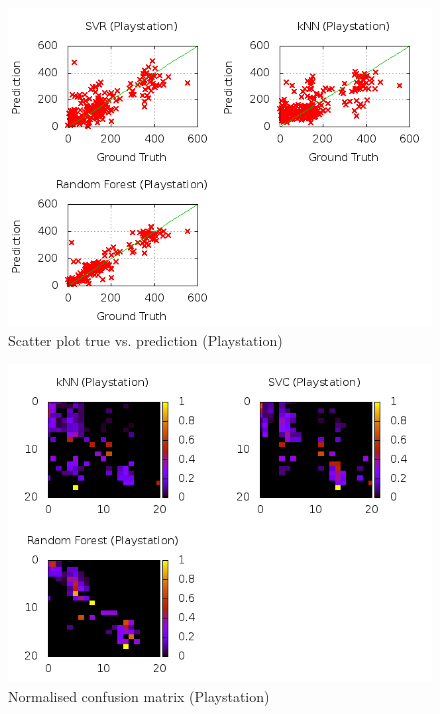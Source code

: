 \begin{figure}
\centering
\includegraphics[scale=0.55]{images/plots/machine_learning/playstation/true_pred_playstation.png}
\caption{Scatter plot true vs. prediction (Playstation)}
\label{true_predict_playstation}
\end{figure}
\begin{figure}
\centering
\includegraphics[scale=0.55]{images/plots/machine_learning/playstation/conf_mat_playstation.png}
\caption{Normalised confusion matrix (Playstation)}
\label{conf_mat_playstation}
\end{figure}
